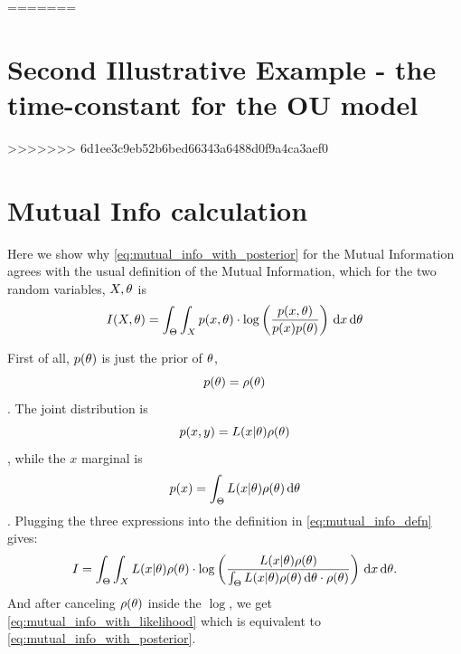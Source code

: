 \documentclass{article}
\begin{document}
\clearpage











\clearpage
\appendix
=======

\section{Second Illustrative Example - the time-constant for the OU model}

\clearpage \appendix
>>>>>>> 6d1ee3c9eb52b6bed66343a6488d0f9a4ca3aef0
\section{Mutual Info calculation}
\label{sec:mutual_info_defn} 
Here we show why \cref{eq:mutual_info_with_posterior} for
the Mutual Information agrees with the usual definition of the Mutual Information, which
for the two random variables, $X,{\theta}$ is
\begin{equation}
I(X,{\theta}) = \int_\Theta \int_X p(x,{\theta}) \cdot \log \left(
\frac{p(x,{\theta})}{p(x)p({\theta})}\right) \, \mathrm{d} x \, \mathrm{d} {\theta}
\label{eq:mutual_info_defn}
\end{equation}

First of all, $p({\theta})$  is just the prior of ${\theta}$, $$p({\theta}) = \rho({\theta})$$.
The joint distribution is $$p(x,y) = L(x|{\theta})\rho({\theta})$$, while the $x$
marginal is $$p(x) = \int_\Theta L(x|{\theta})\rho({\theta}) \, \mathrm{d} {\theta}$$.
Plugging the three expressions into the definition in
\cref{eq:mutual_info_defn} gives:
\begin{equation}
I = \int_\Theta \int_X L(x|{\theta})\rho({\theta}) \cdot 
\log \left( \frac{L(x|{\theta})\rho({\theta}) }{\int_\Theta L(x|{\theta})\rho({\theta}) \, \mathrm{d} {\theta}
\cdot \rho({\theta}) } \right)
\, \mathrm{d} x\, \mathrm{d} {\theta}.
\label{eq:mutual_info_prior_trajectory}
\end{equation}
And after canceling $\rho({\theta})$ inside the $\log$, we get
\cref{eq:mutual_info_with_likelihood} which is equivalent to
\cref{eq:mutual_info_with_posterior}.




 

\end{document}
